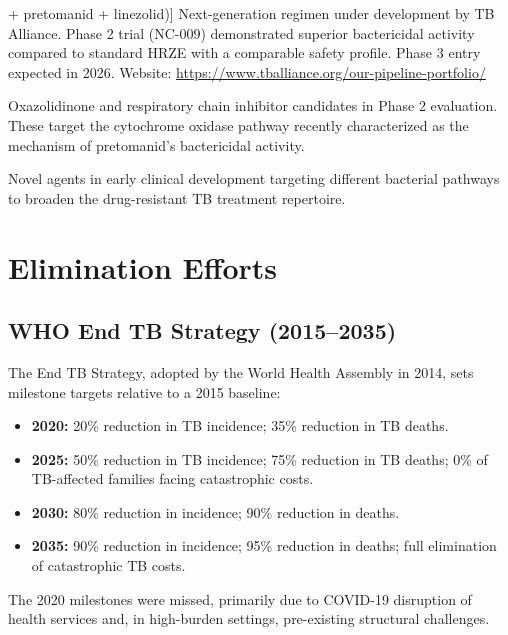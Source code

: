 \documentclass[11pt]{article}
\begin{document}
\begin{description}[style=nextline]

  \item[SPaL (sorfequiline [TBAJ-876] + pretomanid + linezolid)]
  Next-generation regimen under development by TB Alliance. Phase 2 trial (NC-009) demonstrated superior bactericidal activity compared to standard HRZE with a comparable safety profile. Phase 3 entry expected in 2026. Website: \url{https://www.tballiance.org/our-pipeline-portfolio/}

  \item[Delpazolid, sutezolid, and telacebec (Q203)]
  Oxazolidinone and respiratory chain inhibitor candidates in Phase 2 evaluation. These target the cytochrome oxidase pathway recently characterized as the mechanism of pretomanid's bactericidal activity.

  \item[TBI-223 and TBAJ-587]
  Novel agents in early clinical development targeting different bacterial pathways to broaden the drug-resistant TB treatment repertoire.

\end{description}

\section{Elimination Efforts}
\label{sec:elimination}

\subsection{WHO End TB Strategy (2015--2035)}

The End TB Strategy, adopted by the World Health Assembly in 2014, sets milestone targets relative to a 2015 baseline:
\begin{itemize}
  \item \textbf{2020:} 20\% reduction in TB incidence; 35\% reduction in TB deaths.
  \item \textbf{2025:} 50\% reduction in TB incidence; 75\% reduction in TB deaths; 0\% of TB-affected families facing catastrophic costs.
  \item \textbf{2030:} 80\% reduction in incidence; 90\% reduction in deaths.
  \item \textbf{2035:} 90\% reduction in incidence; 95\% reduction in deaths; full elimination of catastrophic TB costs.
\end{itemize}
The 2020 milestones were missed, primarily due to COVID-19 disruption of health services and, in high-burden settings, pre-existing structural challenges.
\end{document}
